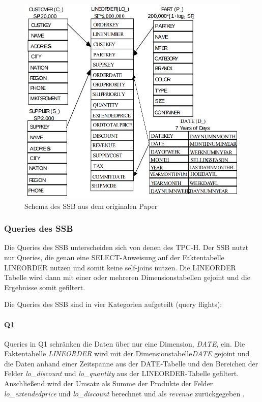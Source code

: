 \begin{figure}[ht]  %
    \centering      %
    \includegraphics[width=1\textwidth]{pictures/ssb/ssb-schema.png}
    \caption{Schema des \ac{SSB} aus dem originalen Paper~\cite{oneil_star_2009}}      %
    \label{pic:ssb-schema}    %
\end{figure}


\subsubsection{Queries des \ac{SSB}}
Die Queries des \ac{SSB} unterscheiden sich von denen des \ac{TPC-H}.
Der \ac{SSB} nutzt nur Queries, die genau eine SELECT-Anweisung auf der Faktentabelle LINEORDER nutzen und somit keine self-joins nutzen. %
Die LINEORDER Tabelle wird dann mit einer oder mehreren Dimensionstabellen gejoint und die Ergebnisse somit gefiltert. 

Die Queries des \ac{SSB} sind in vier Kategorien aufgeteilt (query flights): %


\paragraph{Q1}\label{sec:ssb-q1}
Queries in Q1 schränken die Daten über nur eine Dimension, \emph{DATE}, ein.
Die Faktentabelle \emph{LINEORDER} wird mit der Dimensionstabelle\emph{DATE} gejoint und die Daten anhand einer Zeitspanne aus der DATE-Tabelle und den Bereichen der Felder \emph{lo\_discount} und \emph{lo\_quantity} aus der LINEORDER-Tabelle gefiltert.
Anschließend wird der Umsatz als Summe der Produkte der Felder \emph{lo\_extendedprice} und \emph{lo\_discount} berechnet und als \emph{revenue} zurückgegeben \cite{oneil_star_2009}.


